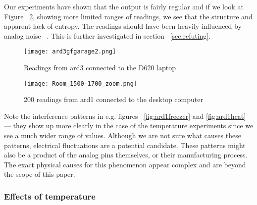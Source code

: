 \documentclass[a4paper]{article}           %
\begin{document}
Our experiments have shown that the output is fairly regular and if we look at Figure ~\ref{fig:ardzoom}, showing more limited ranges of readings, we see that the structure and apparent lack of entropy. The readings should have been heavily influenced by analog noise ~\cite{ardref}. This is further investigated in section ~\ref{sec:refuting}. 

\begin{figure}[h!]
  \centering
  \texttt{[image: ard3gfgarage2.png]}
  \caption{Readings from ard3 connected to the D620 laptop}
  \label{fig:gfgarageard3}
\end{figure}

\begin{figure}[h!]


  \centering
  \texttt{[image: Room\_1500-1700\_zoom.png]}
  \caption{200 readings from ard1 connected to the desktop computer}
  \label{fig:ardzoom}

\end{figure}


Note the interference patterns in e.g. figures ~\ref{fig:ard1freezer} and \ref{fig:ard1heat} --- they show up more clearly in the case of the temperature experiments since we see a much wider range of values. Although we are not sure what causes these patterns, electrical fluctuations are a potential candidate. These patterns might also be a product of the analog pins themselves, or their manufacturing process. The exact physical causes for this phenomenon appear complex and are beyond the scope of this paper. 

\FloatBarrier
\subsubsection{Effects of temperature}
\FloatBarrier
\end{document}
